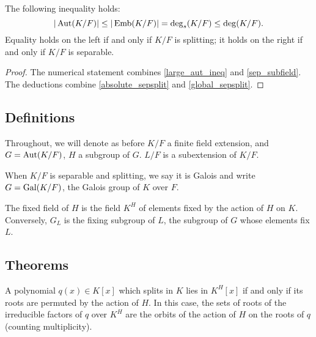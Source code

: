 \begin{theorem} The following inequality holds:
\begin{equation*}
|\operatorname{\text{Aut}}(K/F)| \leq |\operatorname{\text{Emb}}(K/F)| = \deg_s(K/F) \leq \deg(K/F).
\end{equation*}
Equality holds on the left if and only if $K/F$ is splitting; it holds on the
right if and only if $K/F$ is separable.
\label{galois_size}
\end{theorem}

\begin{proof} The numerical statement combines \ref{large_aut_ineq} and
\ref{sep_subfield}.  The deductions combine \ref{absolute_sepsplit} and
\ref{global_sepsplit}. \end{proof}

\subsection{Definitions}

Throughout, we will denote as before $K/F$ a finite field extension, and $G =
\operatorname{\text{Aut}}(K/F)$, $H$ a subgroup of $G$.  $L/F$ is a subextension of $K/F$.

\begin{definition} When $K/F$ is separable and splitting, we say it is Galois and
write $G = \operatorname{\text{Gal}}(K/F)$, the Galois group of $K$ over $F$.
\label{defn:galois_extension}
\end{definition}

\begin{definition} The fixed field of $H$ is the field $K^H$ of elements fixed by
the action of $H$ on $K$.  Conversely, $G_L$ is the fixing subgroup of $L$,
the subgroup of $G$ whose elements fix $L$.
\label{defn:fixing}
\end{definition}

\subsection{Theorems}

\begin{lemma} A polynomial $q(x) \in K[x]$ which splits in $K$ lies in
$K^H[x]$ if and only if its roots are permuted by the action of $H$.  In this
case, the sets of roots of the irreducible factors of $q$ over $K^H$ are the orbits
of the action of $H$ on the roots of $q$ (counting multiplicity).
\label{root_action}
\end{lemma}

